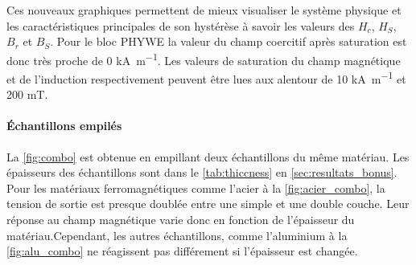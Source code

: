 Ces nouveaux graphiques permettent de mieux visualiser le système physique et les caractéristiques principales de son hystérèse à savoir les valeurs des \(H_c\), \(H_S\), \(B_r\) et \(B_S\). Pour le bloc PHYWE la valeur du champ coercitif après saturation est donc très proche de 0 \si{\kilo\ampere\per\meter}. Les valeurs de saturation  du champ magnétique et de l'induction respectivement peuvent être lues aux alentour de 10 \si{\kilo\ampere\per\meter} et 200 \si{\milli\tesla}.

\paragraph{Échantillons empilés}
La \autoref{fig:combo} est obtenue en empillant deux échantillons du même matériau. Les épaisseurs des échantillons sont dans le \autoref{tab:thiccness} en \autoref{sec:resultats_bonus}. Pour les matériaux ferromagnétiques comme l'acier à la \autoref{fig:acier_combo}, la tension de sortie est presque doublée entre une simple et une double couche. Leur réponse au champ magnétique varie donc en fonction de l'épaisseur du matériau.Cependant, les autres échantillons, comme l'aluminium à la \autoref{fig:alu_combo} ne réagissent pas différement si l'épaisseur est changée.

